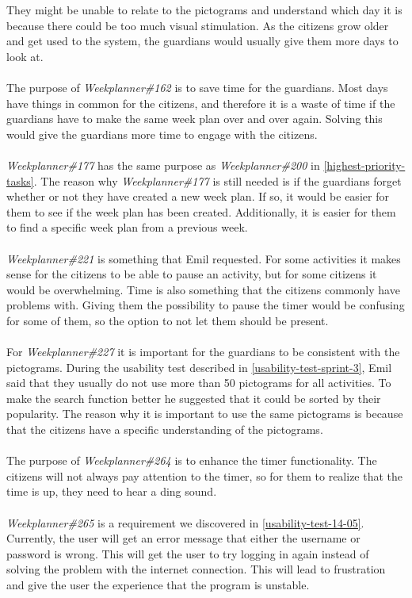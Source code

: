 They might be unable to relate to the pictograms and understand which day it is because there could be too much visual stimulation.
As the citizens grow older and get used to the system, the guardians would usually give them more days to look at.
\\\\
The purpose of \textit{Weekplanner\#162} is to save time for the guardians. 
Most days have things in common for the citizens, and therefore it is a waste of time if the guardians have to make the same week plan over and over again.
Solving this would give the guardians more time to engage with the citizens.
\\\\
\textit{Weekplanner\#177} has the same purpose as \textit{Weekplanner\#200} in \autoref{highest-priority-tasks}. 
The reason why \textit{Weekplanner\#177} is still needed is if the guardians forget whether or not they have created a new week plan.
If so, it would be easier for them to see if the week plan has been created.
Additionally, it is easier for them to find a specific week plan from a previous week.
\\\\
\textit{Weekplanner\#221} is something that Emil requested. 
For some activities it makes sense for the citizens to be able to pause an activity, but for some citizens it would be overwhelming.
Time is also something that the citizens commonly have problems with. 
Giving them the possibility to pause the timer would be confusing for some of them, so the option to not let them should be present.
\\\\
For \textit{Weekplanner\#227} it is important for the guardians to be consistent with the pictograms.
During the usability test described in \autoref{usability-test-sprint-3}, Emil said that they usually do not use more than 50 pictograms for all activities.
To make the search function better he suggested that it could be sorted by their popularity.
The reason why it is important to use the same pictograms is because that the citizens have a specific understanding of the pictograms.
\\\\
The purpose of \textit{Weekplanner\#264} is to enhance the timer functionality.
The citizens will not always pay attention to the timer, so for them to realize that the time is up, they need to hear a ding sound.
\\\\
\textit{Weekplanner\#265} is a requirement we discovered in \autoref{usability-test-14-05}. 
Currently, the user will get an error message that either the username or password is wrong. 
This will get the user to try logging in again instead of solving the problem with the internet connection.
This will lead to frustration and give the user the experience that the program is unstable.


